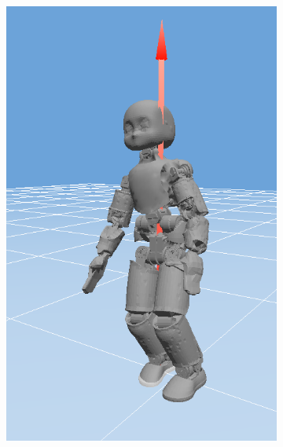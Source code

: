 \begin{figure}[t]
        \begin{subfigure}[b]{0.32\textwidth}
        \centering
        \includegraphics[width=\columnwidth]{chapter_compliant_contact/figures/step1.png}
    \end{subfigure}
    \hfill
    \begin{subfigure}[b]{0.32\textwidth}
        \centering

\end{subfigure}
\end{figure}
